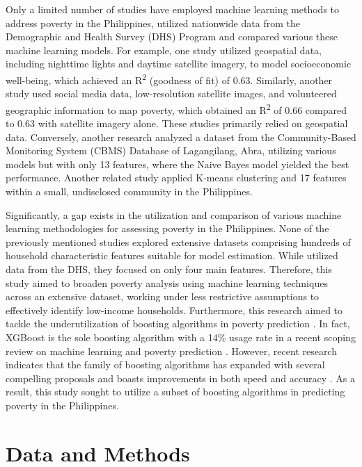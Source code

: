 \documentclass[a4paper,fleqn]{cas-sc}
\begin{document}
Only a limited number of studies have employed machine learning methods to address poverty in the Philippines, utilized nationwide data from the Demographic and Health Survey (DHS) Program and compared various these machine learning models. For example, one study \citep{tingzon2019mapping} utilized geospatial data, including nighttime lights and daytime satellite imagery, to model socioeconomic well-being, which achieved an R\textsuperscript{2} (goodness of fit) of 0.63. Similarly, another study \citep{ledesma2020interpretable} used social media data, low-resolution satellite images, and volunteered geographic information to map poverty, which obtained an R\textsuperscript{2} of 0.66 compared to 0.63 with satellite imagery alone. These studies primarily relied on geospatial data. Conversely, another research \citep{talingdan2019performance} analyzed a dataset from the Community-Based Monitoring System (CBMS) Database of Lagangilang, Abra, utilizing various models but with only 13 features, where the Naive Bayes model yielded the best performance. Another related study \citep{repollo2021applying} applied K-means clustering and 17 features within a small, undisclosed community in the Philippines.

Significantly, a gap exists in the utilization and comparison of various machine learning methodologies for assessing poverty in the Philippines. None of the previously mentioned studies explored extensive datasets comprising hundreds of household characteristic features suitable for model estimation. While \cite{tingzon2019mapping} utilized data from the DHS, they focused on only four main features. Therefore, this study aimed to broaden poverty analysis using machine learning techniques across an extensive dataset, working under less restrictive assumptions to effectively identify low-income households. Furthermore, this research aimed to tackle the underutilization of boosting algorithms in poverty prediction \citep{li2022poverty}. In fact, XGBoost is the sole boosting algorithm with a 14\% usage rate in a recent scoping review on machine learning and poverty prediction \citep{usmanova2022utilities}. However, recent research indicates that the family of boosting algorithms has expanded with several compelling proposals and boasts improvements in both speed and accuracy \citep{bentejac2021comparative}. As a result, this study sought to utilize a subset of boosting algorithms in predicting poverty in the Philippines.

\section{Data and Methods}
\end{document}
